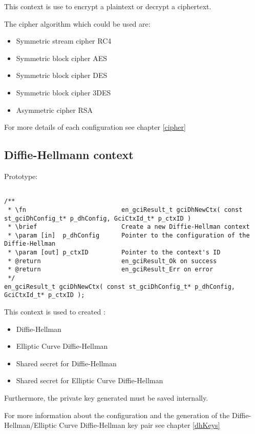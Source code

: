 This context is use to encrypt a plaintext or decrypt a ciphertext.

The cipher algorithm which could be used are:
\begin{itemize}
  \item Symmetric stream cipher RC4
  \item Symmetric block cipher AES
  \item Symmetric block cipher DES
  \item Symmetric block cipher 3DES
  \item Asymmetric cipher RSA
\end{itemize}

For more details of each configuration see chapter \ref{cipher}

\newpage


\subsection{Diffie-Hellmann context}

Prototype:
\begin{lstlisting}

/**
 * \fn							en_gciResult_t gciDhNewCtx( const st_gciDhConfig_t* p_dhConfig, GciCtxId_t* p_ctxID )
 * \brief						Create a new Diffie-Hellman context
 * \param [in]  p_dhConfig		Pointer to the configuration of the Diffie-Hellman
 * \param [out] p_ctxID			Pointer to the context's ID
 * @return						en_gciResult_Ok on success
 * @return						en_gciResult_Err on error
 */
en_gciResult_t gciDhNewCtx( const st_gciDhConfig_t* p_dhConfig, GciCtxId_t* p_ctxID );

\end{lstlisting}

This context is used to created :
\begin{itemize}
  \item Diffie-Hellman
  \item Elliptic Curve Diffie-Hellman
  \item Shared secret for Diffie-Hellman
  \item Shared secret for Elliptic Curve
Diffie-Hellman
\end{itemize}

Furthermore, the private key generated must be saved internally. 

For more information about the configuration and the generation of the
Diffie-Hellman/Elliptic Curve Diffie-Hellman key pair see chapter \ref{dhKeys}

